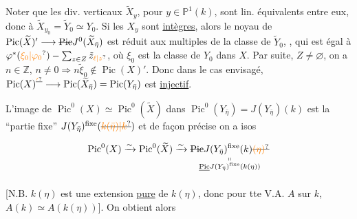  Noter que les div.
verticaux $\widetilde X_y$, pour $y\in\mathbb P^1(k)$, 
sont lin. équivalents entre eux, donc à
$\widetilde X_{y_0}=\widetilde Y_0\simeq Y_0$.  Si  les $X_y$ sont 
 \uline{intègres}, alors le noyau de
$\operatorname{Pic}(\widetilde X)'\longrightarrow\deleted{\operatorname{Pic}}J^0(\widetilde X_{\bar\eta})$ est réduit aux  multiples
de  la classe  de $\widetilde Y_0$,  , qui est
égal à $\varphi^*(\unsure{\xi_0|\varphi_0})-\sum_{z\in Z}\tilde z_{\unsure{\ell|z}}$, où $\xi_0$ est la classe de
$Y_0$ dans $X$. Par suite,   $Z\ne\varnothing$, on
a $n\in\mathbb Z$, $n\ne0\Longrightarrow n\tilde\xi_0\notin\operatorname{Pic}(X)'$. Donc
dans le cas envisagé, $\operatorname{Pic}(X)^{\deleted{\unsure{'}}}\longrightarrow\operatorname{Pic}(\widetilde X_{\bar\eta})=\operatorname{Pic}(Y_{\bar\eta})$
est \uline{injectif}.

L’image de $\operatorname{Pic}^0(X)\simeq\operatorname{Pic}^0(\widetilde X)$ dans
 $\operatorname{Pic}^0(Y_{\bar\eta})=J(Y_{\bar\eta})(k)$ est la ``partie  fixe''
$J(Y_{\bar\eta})^{\mathrm{fixe}}(\deleted{\unsure{k(\bar\eta)|k}})$ et de façon précise on a  isos

\[
\operatorname{Pic}^0(X)\xrightarrow{\sim}\operatorname{Pic}^0(\widetilde X)\xrightarrow{\sim}
\underset{\substack{\shortparallel\\ \deleted{\operatorname{Pic}}J(Y_{\bar\eta})^{\rm fixe}(k(\eta))}}
{\deleted{\operatorname{Pic}}J(Y_{\bar\eta})^{\rm fixe}(k)\deleted{\unsure{(\eta)}}}
\]

[N.B.  $k(\eta)$ est
une extension \uline{pure} de $k(\eta)$, donc pour tte
V.A. $A$ sur $k$, $A(k)\simeq A(k(\eta))$]. On obtient
alors


